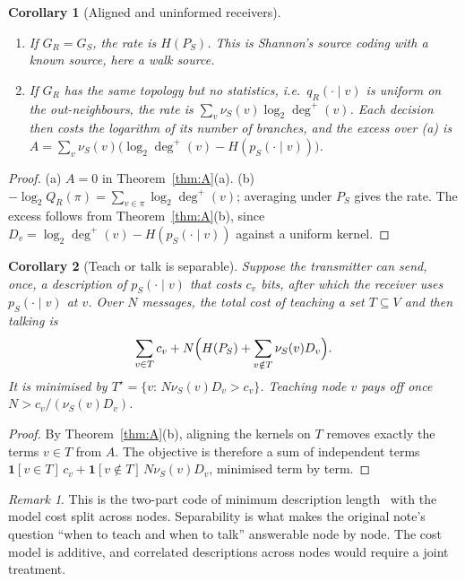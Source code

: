 \documentclass[11pt]{article}
\newtheorem{corollary}{Corollary}
\theoremstyle{definition}
\theoremstyle{remark}
\newtheorem{remark}{Remark}
\begin{document}
\begin{corollary}[Aligned and uninformed receivers]\label{cor:limits}
\begin{enumerate}
\item[(a)] If $G_R=G_S$, the rate is $H(P_S)$. This is Shannon's source coding with a known source, here a walk source.
\item[(b)] If $G_R$ has the same topology but no statistics, i.e.\ $q_R(\cdot\mid v)$ is uniform on the out-neighbours, the rate is $\sum_v\nu_S(v)\log_2\deg^+(v)$. Each decision then costs the logarithm of its number of branches, and the excess over (a) is $A=\sum_v\nu_S(v)\bigl(\log_2\deg^+(v)-H(p_S(\cdot\mid v))\bigr)$.
\end{enumerate}
\end{corollary}

\begin{proof}
(a) $A=0$ in Theorem~\ref{thm:A}(a). (b) $-\log_2Q_R(\pi)=\sum_{v\in\pi}\log_2\deg^+(v)$; averaging under $P_S$ gives the rate. The excess follows from Theorem~\ref{thm:A}(b), since $D_v=\log_2\deg^+(v)-H(p_S(\cdot\mid v))$ against a uniform kernel.
\end{proof}

\begin{corollary}[Teach or talk is separable]\label{cor:teach}
Suppose the transmitter can send, once, a description of $p_S(\cdot\mid v)$ that costs $c_v$ bits, after which the receiver uses $p_S(\cdot\mid v)$ at $v$. Over $N$ messages, the total cost of teaching a set $T\subseteq V$ and then talking is
\[
\sum_{v\in T}c_v+N\Bigl(H(P_S)+\sum_{v\notin T}\nu_S(v)D_v\Bigr).
\]
It is minimised by $T^\star=\{v:\,N\nu_S(v)D_v>c_v\}$. Teaching node $v$ pays off once $N>c_v/(\nu_S(v)D_v)$.
\end{corollary}

\begin{proof}
By Theorem~\ref{thm:A}(b), aligning the kernels on $T$ removes exactly the terms $v\in T$ from $A$. The objective is therefore a sum of independent terms $\mathbf{1}[v\in T]\,c_v+\mathbf{1}[v\notin T]\,N\nu_S(v)D_v$, minimised term by term.
\end{proof}

\begin{remark}
This is the two-part code of minimum description length~\cite{rissanen1978,barron1998} with the model cost split across nodes. Separability is what makes the original note's question ``when to teach and when to talk'' answerable node by node. The cost model is additive, and correlated descriptions across nodes would require a joint treatment.
\end{remark}
\end{document}

